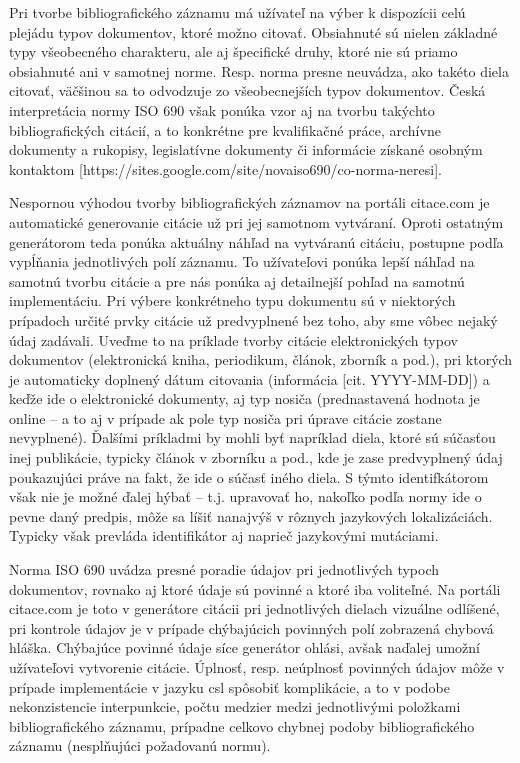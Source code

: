 \documentclass{fithesis3}
\begin{document}
	Pri tvorbe bibliografického záznamu má užívateľ na výber k dispozícii celú plejádu typov dokumentov, ktoré možno citovať. Obsiahnuté sú nielen základné typy všeobecného charakteru, ale aj špecifické druhy, ktoré nie sú priamo obsiahnuté ani v samotnej norme. Resp. norma presne neuvádza, ako takéto diela citovať, väčšinou sa to odvodzuje zo všeobecnejších typov dokumentov. Česká interpretácia normy ISO 690 však ponúka vzor aj na tvorbu takýchto bibliografických citácií, a to konkrétne pre kvalifikačné práce, archívne dokumenty a rukopisy, legislatívne dokumenty či informácie získané osobným kontaktom [https://sites.google.com/site/novaiso690/co-norma-neresi].
	
	Nespornou výhodou tvorby bibliografických záznamov na portáli citace.com je automatické generovanie citácie už pri jej samotnom vytváraní. Oproti ostatným generátorom teda ponúka aktuálny náhľad na vytváranú citáciu, postupne podľa vypĺňania jednotlivých polí záznamu. To užívateľovi ponúka lepší náhľad na samotnú tvorbu citácie a pre nás ponúka aj detailnejší pohľad na samotnú implementáciu. Pri výbere konkrétneho typu dokumentu sú v niektorých prípadoch určité prvky citácie už predvyplnené bez toho, aby sme vôbec nejaký údaj zadávali. Uveďme to na príklade tvorby citácie elektronických typov dokumentov (elektronická kniha, periodikum, článok, zborník a pod.), pri ktorých je automaticky doplnený dátum citovania (informácia [cit. YYYY-MM-DD]) a keďže ide o elektronické dokumenty, aj typ nosiča (prednastavená hodnota je online -- a to aj v prípade ak pole typ nosiča pri úprave citácie zostane nevyplnené). Ďalšími príkladmi by mohli byť napríklad diela, ktoré sú súčasťou inej publikácie, typicky článok v zborníku a pod., kde je zase predvyplnený údaj  poukazujúci práve na fakt, že ide o súčasť iného diela. S týmto identifkátorom však nie je možné ďalej hýbať -- t.j. upravovať ho, nakoľko podľa normy ide o pevne daný predpis, môže sa líšiť nanajvýš v rôznych jazykových lokalizáciách. Typicky však prevláda identifikátor  aj naprieč jazykovými mutáciami.
	
	Norma ISO 690 uvádza presné poradie údajov pri jednotlivých typoch dokumentov, rovnako aj ktoré údaje sú povinné a ktoré iba voliteľné. Na portáli citace.com je toto v generátore citácii pri jednotlivých dielach vizuálne odlíšené, pri kontrole údajov je v prípade chýbajúcich povinných polí zobrazená chybová hláška. Chýbajúce povinné údaje síce generátor ohlási, avšak naďalej umožní užívateľovi vytvorenie citácie. Úplnosť, resp. neúplnosť povinných údajov môže v prípade implementácie v jazyku csl spôsobiť komplikácie, a to v podobe nekonzistencie interpunkcie, počtu medzier medzi jednotlivými položkami bibliografického záznamu, prípadne celkovo chybnej podoby bibliografického záznamu (nesplňujúci požadovanú normu).
	
\end{document}
